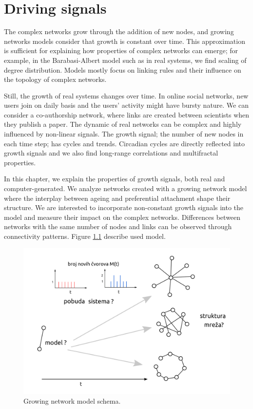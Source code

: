 
\chapter{Driving signals} %

\label{Chapter2} %




The complex networks grow through the addition of new nodes, and growing networks models consider that growth is constant over time. This approximation is sufficient for explaining how properties of complex networks can emerge; for example, in the Barabasi-Albert model such as in real systems, we find scaling of degree distribution. Models mostly focus on linking rules and their influence on the topology of complex networks. 

Still, the growth of real systems changes over time. In online social networks, new users join on daily basis and the users' activity might have bursty nature. We can consider a co-authorship network, where links are created between scientists when they publish a paper. The dynamic of real networks can be complex and highly influenced by non-linear signals. The growth signal; the number of new nodes in each time step; has cycles and trends. Circadian cycles are directly reflected into growth signals and we also find long-range correlations and multifractal properties. 

In this chapter, we explain the properties of growth signals, both real and computer-generated. We analyze networks created with a growing network model where the interplay between ageing and preferential attachment shape their structure. We are interested to incorporate non-constant growth signals into the model and measure their impact on the complex networks. Differences between networks with the same number of nodes and links can be observed through connectivity patterns. Figure \ref{fig:ciljevi} describe used model. 
   

\begin{figure}[!ht]
	\centering
	\includegraphics[width=0.6\linewidth]{Figures/ciljevi3.png}
	\caption{Growing network model schema.}
	\label{fig:ciljevi}
\end{figure}

